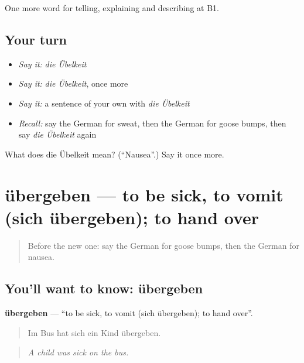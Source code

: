 \begin{grammarlens}[title={What you've built}]
One more word for telling, explaining and describing at B1.
\end{grammarlens}

\subsection*{Your turn}
\begin{itemize}
\raggedright
  \item \emph{Say it:} \emph{die Übelkeit}
  \item \emph{Say it:} \emph{die Übelkeit}, once more
  \item \emph{Say it:} a sentence of your own with \emph{die Übelkeit}
  \item \emph{Recall:} say the German for sweat, then the German for goose bumps, then say \emph{die Übelkeit} again
\end{itemize}

\begin{tcolorbox}[breakable,colback=teal!4,colframe=teal!35!black,title={Before you move on}]
What does die Übelkeit mean? (\textquotedblleft{}Nausea\textquotedblright{}.) Say it once more.
\end{tcolorbox}
\section[übergeben]{übergeben — to be sick, to vomit (sich übergeben); to hand over}

\label{lesson:GE-C480-uebergeben}



\begin{quote}
Before the new one: say the German for goose bumps, then the German for nausea.
\end{quote}

\subsection*{You'll want to know: übergeben}
\textbf{übergeben} — \textquotedblleft{}to be sick, to vomit (sich übergeben); to hand over\textquotedblright{}.

\begin{quote}
Im Bus hat sich ein Kind übergeben.
\end{quote}

\begin{quote}
\emph{A child was sick on the bus.}
\end{quote}

